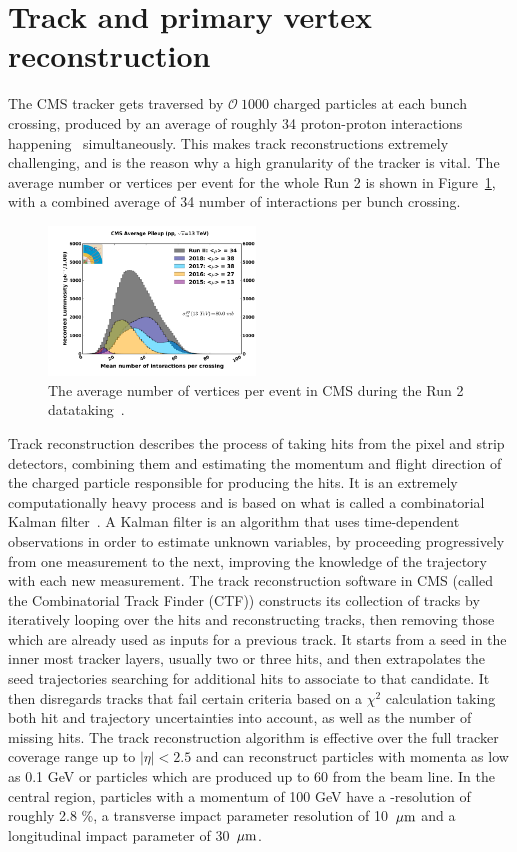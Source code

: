 \section{Track and primary vertex reconstruction}
The CMS tracker gets traversed by $\mathcal{O}~1000$ charged particles at each bunch crossing, produced by an average of roughly 34 proton-proton interactions happening ~simultaneously. This makes track reconstructions extremely challenging, and is the reason why a high granularity of the tracker is vital.
The average number or vertices per event for the whole Run 2 is shown in Figure~\ref{fig:objreco:pu}, with a combined average of 34 number of interactions per bunch crossing.
\begin{figure}[h] 
    \centering
    \includegraphics[width=0.49\textwidth]{figures/event_reconstruction/pu.pdf}
    \caption{The average number of vertices per event in CMS during the Run 2 datataking~\cite{CMSlumi}.}
    \label{fig:objreco:pu}
\end{figure}
Track reconstruction describes the process of taking hits from the pixel and strip detectors, combining them and estimating the momentum and flight direction of the charged particle responsible for producing the hits. It is an extremely computationally heavy process and is based on what is called a combinatorial Kalman filter~\cite{BILLOIR1989390}. A Kalman filter is an algorithm that uses time-dependent observations in order to estimate unknown variables, by proceeding progressively from one measurement to the next, improving the knowledge of the
trajectory with each new measurement. The track reconstruction software in CMS (called the Combinatorial Track Finder (CTF)) constructs its collection of tracks by iteratively looping over the hits and reconstructing tracks, then removing those which are already used as inputs for a previous track. It starts from a seed in the inner most tracker layers, usually two or three hits, and then extrapolates the seed trajectories searching for additional hits to associate to that candidate. It then disregards tracks that fail certain criteria  based on a $\chi^2$ calculation taking both hit and trajectory uncertainties into account, as well as the number of missing hits.
The track reconstruction algorithm is effective over the full tracker coverage range up to $|\eta|<2.5$ and can reconstruct particles with momenta as low as 0.1 GeV or particles which are produced up to 60 \cm from the beam line. In the central region, particles with a momentum of 100 GeV have a \PT-resolution of roughly 2.8 \%, a transverse impact parameter resolution of 10 $\,\mu\text{m}$ and a longitudinal impact parameter of 30 $\,\mu\text{m}$. 

